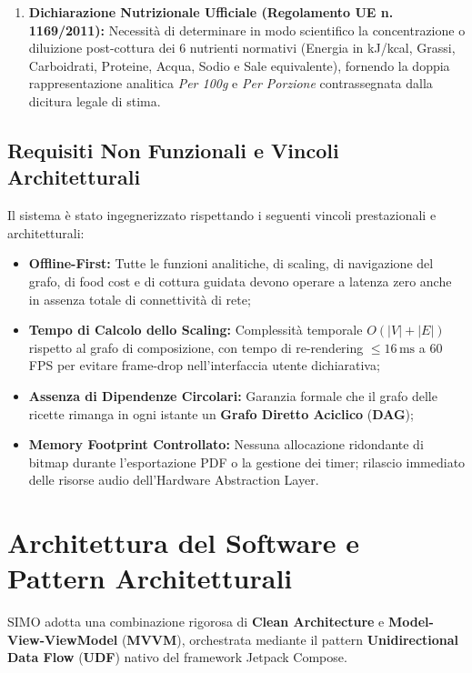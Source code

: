 \documentclass[11pt,a4paper,titlepage]{article}
\begin{document}
\begin{enumerate}[leftmargin=*]
    \item \textbf{Dichiarazione Nutrizionale Ufficiale (Regolamento UE n. 1169/2011):} Necessit\`a di determinare in modo scientifico la concentrazione o diluizione post-cottura dei 6 nutrienti normativi (Energia in kJ/kcal, Grassi, Carboidrati, Proteine, Acqua, Sodio e Sale equivalente), fornendo la doppia rappresentazione analitica \textit{Per 100g} e \textit{Per Porzione} contrassegnata dalla dicitura legale di stima.
\end{enumerate}

\subsection{Requisiti Non Funzionali e Vincoli Architetturali}
Il sistema \`e stato ingegnerizzato rispettando i seguenti vincoli prestazionali e architetturali:
\begin{itemize}[leftmargin=*]
    \item \textbf{Offline-First:} Tutte le funzioni analitiche, di scaling, di navigazione del grafo, di food cost e di cottura guidata devono operare a latenza zero anche in assenza totale di connettivit\`a di rete;
    \item \textbf{Tempo di Calcolo dello Scaling:} Complessit\`a temporale $O(|V| + |E|)$ rispetto al grafo di composizione, con tempo di re-rendering $\le 16\,\text{ms}$ a 60\,FPS per evitare frame-drop nell'interfaccia utente dichiarativa;
    \item \textbf{Assenza di Dipendenze Circolari:} Garanzia formale che il grafo delle ricette rimanga in ogni istante un \textbf{Grafo Diretto Aciclico} (\textbf{DAG});
    \item \textbf{Memory Footprint Controllato:} Nessuna allocazione ridondante di bitmap durante l'esportazione PDF o la gestione dei timer; rilascio immediato delle risorse audio dell'Hardware Abstraction Layer.
\end{itemize}

\newpage

\section{Architettura del Software e Pattern Architetturali}
SIMO adotta una combinazione rigorosa di \textbf{Clean Architecture} e \textbf{Model-View-ViewModel} (\textbf{MVVM}), orchestrata mediante il pattern \textbf{Unidirectional Data Flow} (\textbf{UDF}) nativo del framework Jetpack Compose.
\end{document}
